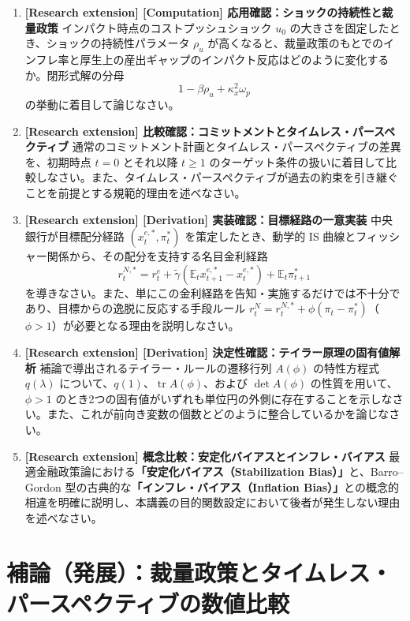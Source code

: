\documentclass[
  japanese,
  lualatex,
  ja=standard,
  12pt,
  a4paper]{ltjsarticle}
\begin{document}
\begin{enumerate}
\def\labelenumi{\arabic{enumi}.}
\setcounter{enumi}{4}
\item
  \textbf{{[}Research extension{]} {[}Computation{]}
  応用確認：ショックの持続性と裁量政策}
  インパクト時点のコストプッシュショック \(u_0\)
  の大きさを固定したとき、ショックの持続性パラメータ \(\rho_u\)
  が高くなると、裁量政策のもとでのインフレ率と厚生上の産出ギャップのインパクト反応はどのように変化するか。閉形式解の分母
  \[
  1-\beta\rho_u+\kappa_x^2\omega_p
  \] の挙動に着目して論じなさい。
\item
  \textbf{{[}Research extension{]}
  比較確認：コミットメントとタイムレス・パースペクティブ}
  通常のコミットメント計画とタイムレス・パースペクティブの差異を、初期時点
  \(t=0\) とそれ以降 \(t\geq1\)
  のターゲット条件の扱いに着目して比較しなさい。また、タイムレス・パースペクティブが過去の約束を引き継ぐことを前提とする規範的理由を述べなさい。
\item
  \textbf{{[}Research extension{]} {[}Derivation{]}
  実装確認：目標経路の一意実装} 中央銀行が目標配分経路
  \((x_t^{e,*}, \pi_t^*)\) を策定したとき、動学的 IS
  曲線とフィッシャー関係から、その配分を支持する名目金利経路 \[
  r_t^{N,*}
  =
  r_t^e
  +\tilde{\gamma}\left(\mathbb{E}_t x_{t+1}^{e,*}-x_t^{e,*}\right)
  +\mathbb{E}_t\pi_{t+1}^*
  \]
  を導きなさい。また、単にこの金利経路を告知・実施するだけでは不十分であり、目標からの逸脱に反応する手段ルール
  \(r_t^N = r_t^{N,*} + \phi(\pi_t - \pi_t^*)\)（\(\phi>1\)）が必要となる理由を説明しなさい。
\item
  \textbf{{[}Research extension{]} {[}Derivation{]}
  決定性確認：テイラー原理の固有値解析}
  補論で導出されるテイラー・ルールの遷移行列 \(A(\phi)\) の特性方程式
  \(q(\lambda)\)
  について、\(q(1)\)、\(\operatorname{tr}A(\phi)\)、および
  \(\det A(\phi)\) の性質を用いて、\(\phi>1\)
  のとき2つの固有値がいずれも単位円の外側に存在することを示しなさい。また、これが前向き変数の個数とどのように整合しているかを論じなさい。
\item
  \textbf{{[}Research extension{]}
  概念比較：安定化バイアスとインフレ・バイアス}
  最適金融政策論における\textbf{「安定化バイアス（Stabilization
  Bias）」}と、Barro--Gordon
  型の古典的な\textbf{「インフレ・バイアス（Inflation
  Bias）」}との概念的相違を明確に説明し、本講義の目的関数設定において後者が発生しない理由を述べなさい。
\end{enumerate}

\clearpage

\section{補論（発展）：裁量政策とタイムレス・パースペクティブの数値比較}\label{ux88dcux8ad6ux767aux5c55ux88c1ux91cfux653fux7b56ux3068ux30bfux30a4ux30e0ux30ecux30b9ux30d1ux30fcux30b9ux30daux30afux30c6ux30a3ux30d6ux306eux6570ux5024ux6bd4ux8f03}
\end{document}
